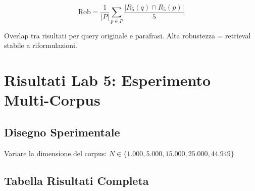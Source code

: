 \documentclass[12pt,a4paper]{article}
\begin{document}
\begin{formulabox}
\[
\text{Rob} = \frac{1}{|P|} \sum_{p \in P} \frac{|R_5(q) \cap R_5(p)|}{5}
\]
\end{formulabox}
Overlap tra risultati per query originale e parafrasi. Alta robustezza = retrieval stabile a riformulazioni.

\section{Risultati Lab 5: Esperimento Multi-Corpus}

\subsection{Disegno Sperimentale}

Variare la dimensione del corpus: $N \in \{1.000, 5.000, 15.000, 25.000, 44.949\}$

\subsection{Tabella Risultati Completa}
\end{document}
